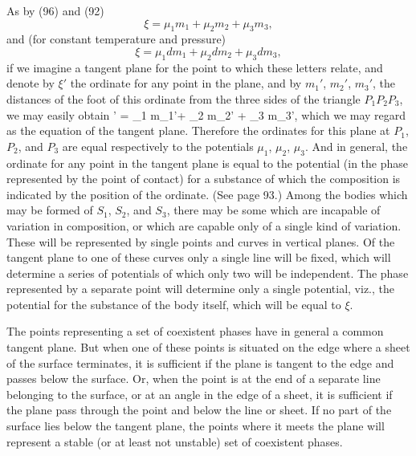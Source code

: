 \documentclass[12pt]{article}
\begin{document}
As by (96) and (92)
$$\xi= \mu_1 m_1+ \mu_2 m_2 +  \mu_3 m_3,$$
and (for constant temperature and pressure)
$$\xi= \mu_1 d m_1+ \mu_2 d m_2 +  \mu_3 d m_3,$$
if we imagine a tangent plane for the point to which these letters relate, and denote by $\xi'$ the ordinate for any point in the plane, and by $m_1'$, $m_2'$, $m_3'$, the distances of the foot of this ordinate from the three sides of the triangle $P_1 P_2 P_3$, we may easily obtain
\eqs  
\xi' = \mu_1 m_1'+ \mu_2 m_2' +  \mu_3 m_3', 
\label{199}\eqe
which we may regard as the equation of the tangent plane. Therefore the ordinates for this plane at $P_1$, $P_2$, and $P_3$ are equal respectively to the potentials $\mu_1$, $\mu_2$, $\mu_3$. And in general, the ordinate for any point in the tangent plane is equal to the potential (in the phase represented by the point of contact) for a substance of which the composition is indicated by the position of the ordinate. (See page 93.) Among the bodies which may be formed of $S_1$, $S_2$, and $S_3$, there may be some which are incapable of variation in composition, or which are capable only of a single kind of variation. These will be represented by single points and curves in vertical planes. Of the tangent plane to one of these curves only a single line will be fixed, which will determine a series of potentials of which only two will be independent. The phase represented by a separate point will determine only a single potential, viz., the potential for the substance of the body itself, which will be equal to $\xi$.


The points representing a set of coexistent phases have in general a common tangent plane. But when one of these points is situated on the edge where a sheet of the surface terminates, it is sufficient if the plane is tangent to the edge and passes below the surface. Or, when the point is at the end of a separate line belonging to the surface, or at an angle in the edge of a sheet, it is sufficient if the plane pass through the point and below the line or sheet. If no part of the surface lies below the tangent plane, the points where it meets the plane will represent a stable (or at least not unstable) set of coexistent phases.
\end{document}
